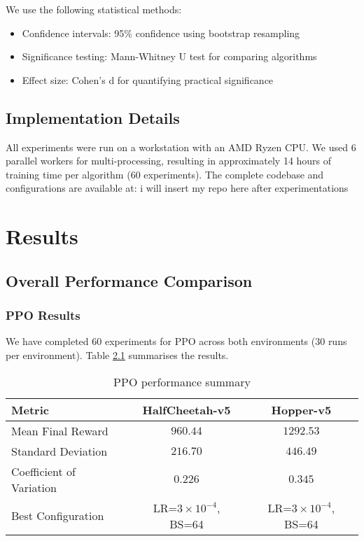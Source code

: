 \documentclass[12pt,a4paper]{report}
\begin{document}
We use the following statistical methods:

\begin{itemize}
    \item Confidence intervals: 95\% confidence using bootstrap resampling
    \item Significance testing: Mann-Whitney U test for comparing algorithms
    \item Effect size: Cohen's d for quantifying practical significance
\end{itemize}

\section{Implementation Details}

All experiments were run on a workstation with an AMD Ryzen CPU. We used 6 parallel workers for multi-processing, resulting in approximately 14 hours of training time per algorithm (60 experiments). The complete codebase and configurations are available at: i will insert my repo here after experimentations

\chapter{Results}

\section{Overall Performance Comparison}

\subsection{PPO Results}

We have completed 60 experiments for PPO across both environments (30 runs per environment). Table \ref{tab:ppo_results} summarises the results.

\begin{table}[h]
\centering
\caption{PPO performance summary}
\label{tab:ppo_results}
\begin{tabular}{lcc}
\toprule
Metric & HalfCheetah-v5 & Hopper-v5 \\
\midrule
Mean Final Reward & $960.44$ & $1292.53$ \\
Standard Deviation & $216.70$ & $446.49$ \\
Coefficient of Variation & $0.226$ & $0.345$ \\
Best Configuration & LR=$3\times10^{-4}$, BS=64 & LR=$3\times10^{-4}$, BS=64 \\
\bottomrule
\end{tabular}
\end{table}
\end{document}
